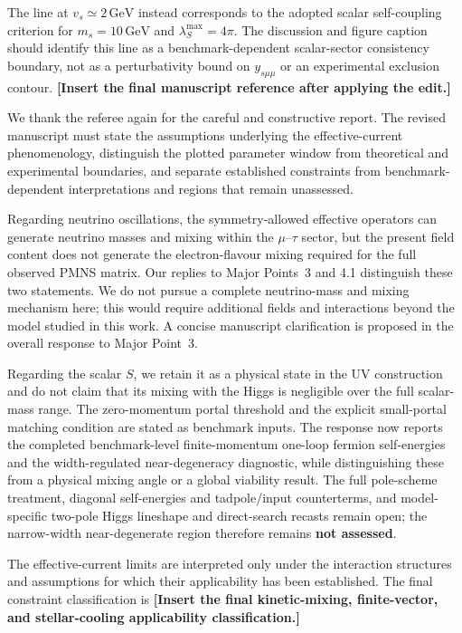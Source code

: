 \documentclass[12pt,a4paper]{article}
\begin{document}
The line at \(v_s\simeq2\,\mathrm{GeV}\) instead corresponds to the adopted scalar self-coupling criterion for \(m_s=10\,\mathrm{GeV}\) and \(\lambda_S^{\max}=4\pi\). The discussion and figure caption should identify this line as a benchmark-dependent scalar-sector consistency boundary, not as a perturbativity bound on \(y_{s\mu\mu}\) or an experimental exclusion contour. \textbf{[Insert the final manuscript reference after applying the edit.]}

\medskip
{}

We thank the referee again for the careful and constructive report. The revised manuscript must state the assumptions underlying the effective-current phenomenology, distinguish the plotted parameter window from theoretical and experimental boundaries, and separate established constraints from benchmark-dependent interpretations and regions that remain unassessed.

Regarding neutrino oscillations, the symmetry-allowed effective operators can generate neutrino masses and mixing within the \(\mu\)--\(\tau\) sector, but the present field content does not generate the electron-flavour mixing required for the full observed PMNS matrix. Our replies to Major Points~3 and 4.1 distinguish these two statements. We do not pursue a complete neutrino-mass and mixing mechanism here; this would require additional fields and interactions beyond the model studied in this work. A concise manuscript clarification is proposed in the overall response to Major Point~3.

Regarding the scalar \(S\), we retain it as a physical state in the UV construction and do not claim that its mixing with the Higgs is negligible over the full scalar-mass range. The zero-momentum portal threshold and the explicit small-portal matching condition are stated as benchmark inputs. The response now reports the completed benchmark-level finite-momentum one-loop fermion self-energies and the width-regulated near-degeneracy diagnostic, while distinguishing these from a physical mixing angle or a global viability result. The full pole-scheme treatment, diagonal self-energies and tadpole/input counterterms, and model-specific two-pole Higgs lineshape and direct-search recasts remain open; the narrow-width near-degenerate region therefore remains \textbf{not assessed}.

The effective-current limits are interpreted only under the interaction structures and assumptions for which their applicability has been established. The final constraint classification is \textbf{[Insert the final kinetic-mixing, finite-vector, and stellar-cooling applicability classification.]}
\end{document}
